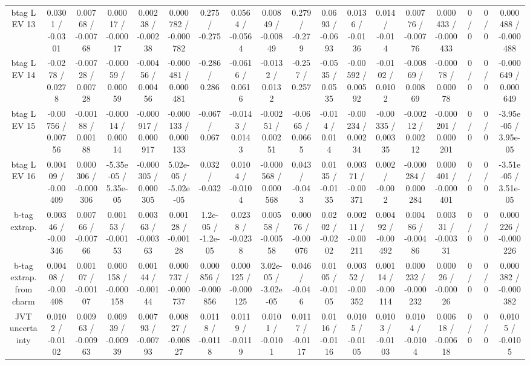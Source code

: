 \documentclass[10pt]{article}
\begin{document}
\begin{table}[htbp]
\begin{center}
\begin{tabular}{|c|c|c|c|c|c|c|c|c|c|c|c|c|c|c|c|c|c|}
  btag L EV 13 & 0.0301 / -0.0301 & 0.00768 / -0.00768 & 0.00017 / -0.00017 & 0.00238 / -0.00238 & 0.000782 / -0.000782 & 0.275 / -0.275 & 0.0564 / -0.0564 & 0.00849 / -0.00849 & 0.279 / -0.279 & 0.0693 / -0.0693 & 0.0136 / -0.0136 & 0.014 / -0.014 & 0.00776 / -0.00776 & 0.000433 / -0.000433 & 0 / 0 & 0 / 0 & 0.000488 / -0.000488 \\ 
  btag L EV 14 & -0.0278 / 0.0278 & -0.00728 / 0.00728 & -0.00059 / 0.00059 & -0.00456 / 0.00456 & -0.000481 / 0.000481 & -0.286 / 0.286 & -0.0616 / 0.0616 & -0.0132 / 0.0132 & -0.257 / 0.257 & -0.0535 / 0.0535 & -0.00592 / 0.00592 & -0.0102 / 0.0102 & -0.00869 / 0.00869 & -0.00078 / 0.00078 & 0 / 0 & 0 / 0 & -0.000649 / 0.000649 \\ 
  btag L EV 15 & -0.00756 / 0.00756 & -0.00188 / 0.00188 & -0.00014 / 0.00014 & -0.000917 / 0.000917 & -0.000133 / 0.000133 & -0.067 / 0.067 & -0.0143 / 0.0143 & -0.00251 / 0.00251 & -0.0665 / 0.0665 & -0.014 / 0.014 & -0.00234 / 0.00234 & -0.00335 / 0.00335 & -0.00212 / 0.00212 & -0.000201 / 0.000201 & 0 / 0 & 0 / 0 & -3.95e-05 / 3.95e-05 \\ 
  btag L EV 16 & 0.00409 / -0.00409 & 0.000306 / -0.000306 & -5.35e-05 / 5.35e-05 & -0.000305 / 0.000305 & 5.02e-05 / -5.02e-05 & 0.032 / -0.032 & 0.0104 / -0.0104 & -0.000568 / 0.000568 & 0.043 / -0.043 & 0.0135 / -0.0135 & 0.00371 / -0.00371 & 0.002 / -0.002 & -0.000284 / 0.000284 & 0.000401 / -0.000401 & 0 / 0 & 0 / 0 & -3.51e-05 / 3.51e-05 \\ 
  b-tag extrap. & 0.00346 / -0.00346 & 0.00766 / -0.00766 & 0.00153 / -0.00153 & 0.00363 / -0.00363 & 0.00128 / -0.00128 & 1.2e-05 / -1.2e-05 & 0.0238 / -0.0238 & 0.00558 / -0.00558 & 0.00076 / -0.00076 & 0.0202 / -0.0202 & 0.00211 / -0.00211 & 0.00492 / -0.00492 & 0.00486 / -0.00486 & 0.00331 / -0.00331 & 0 / 0 & 0 / 0 & 0.000226 / -0.000226 \\ 
  b-tag extrap. from charm & 0.00408 / -0.00408 & 0.00107 / -0.00107 & 0.000158 / -0.000158 & 0.00144 / -0.00144 & 0.000737 / -0.000737 & 0.000856 / -0.000856 & 0.000125 / -0.000125 & 3.02e-05 / -3.02e-05 & 0.046 / -0.046 & 0.0105 / -0.0105 & 0.00352 / -0.00352 & 0.00114 / -0.00114 & 0.000232 / -0.000232 & 0.00026 / -0.00026 & 0 / 0 & 0 / 0 & 0.000382 / -0.000382 \\ 
  JVT uncertainty & 0.0102 / -0.0102 & 0.00963 / -0.00963 & 0.00939 / -0.00939 & 0.00793 / -0.00793 & 0.00827 / -0.00827 & 0.0118 / -0.0118 & 0.0119 / -0.0119 & 0.0101 / -0.0101 & 0.0117 / -0.0117 & 0.0116 / -0.0116 & 0.0105 / -0.0105 & 0.0103 / -0.0103 & 0.0104 / -0.0104 & 0.00618 / -0.00618 & 0 / 0 & 0 / 0 & 0.0105 / -0.0105 \\ 

\end{tabular}
\end{center}
\end{table}
\end{document}
